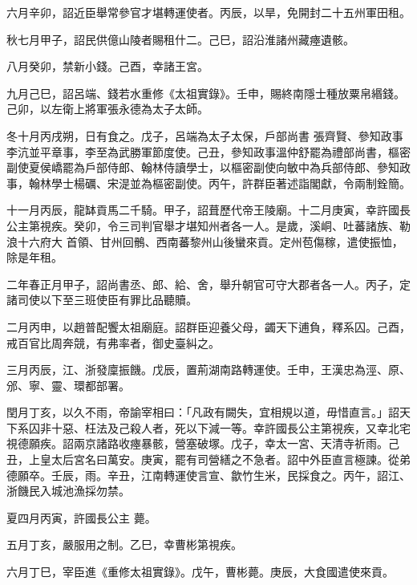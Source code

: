 \begin{pinyinscope}
 六月辛卯，詔近臣舉常參官才堪轉運使者。丙辰，以旱，免開封二十五州軍田租。



 秋七月甲子，詔民供億山陵者賜租什二。己巳，詔沿淮諸州藏瘞遺骸。



 八月癸卯，禁新小錢。己酉，幸諸王宮。



 九月己巳，詔呂端、錢若水重修《太祖實錄》。壬申，賜終南隱士種放粟帛緡錢。己卯，以左衛上將軍張永德為太子太師。



 冬十月丙戌朔，日有食之。戊子，呂端為太子太保，戶部尚書
 張齊賢、參知政事李沆並平章事，李至為武勝軍節度使。己丑，參知政事溫仲舒罷為禮部尚書，樞密副使夏侯嶠罷為戶部侍郎、翰林侍讀學士，以樞密副使向敏中為兵部侍郎、參知政事，翰林學士楊礪、宋湜並為樞密副使。丙午，許群臣著述詣閣獻，令兩制銓簡。



 十一月丙辰，龍缽貢馬二千騎。甲子，詔葺歷代帝王陵廟。十二月庚寅，幸許國長公主第視疾。癸卯，令三司判官舉才堪知州者各一人。是歲，溪峒、吐蕃諸族、勒浪十六府大
 首領、甘州回鶻、西南蕃黎州山後蠻來貢。定州苞傷稼，遣使振恤，除是年租。



 二年春正月甲子，詔尚書丞、郎、給、舍，舉升朝官可守大郡者各一人。丙子，定諸司使以下至三班使臣有罪比品聽贖。



 二月丙申，以趙普配饗太祖廟庭。詔群臣迎養父母，蠲天下逋負，釋系囚。己酉，戒百官比周奔競，有弗率者，御史臺糾之。



 三月丙辰，江、浙發廩振饑。戊辰，置荊湖南路轉運使。壬申，王漢忠為涇、原、邠、寧、靈、環都部署。



 閏月丁亥，以久不雨，帝諭宰相曰：「凡政有闕失，宜相規以道，毋惜直言。」詔天下系囚非十惡、枉法及己殺人者，死以下減一等。幸許國長公主第視疾，又幸北宅視德願疾。詔兩京諸路收瘞暴骸，營塞破塚。戊子，幸太一宮、天清寺祈雨。己丑，上皇太后宮名曰萬安。庚寅，罷有司營繕之不急者。詔中外臣直言極諫。從弟德願卒。壬辰，雨。辛丑，江南轉運使言宣、歙竹生米，民採食之。丙午，詔江、浙饑民入城池漁採勿禁。



 夏四月丙寅，許國長公主
 薨。



 五月丁亥，嚴服用之制。乙巳，幸曹彬第視疾。



 六月丁巳，宰臣進《重修太祖實錄》。戊午，曹彬薨。庚辰，大食國遣使來貢。




\end{pinyinscope}
